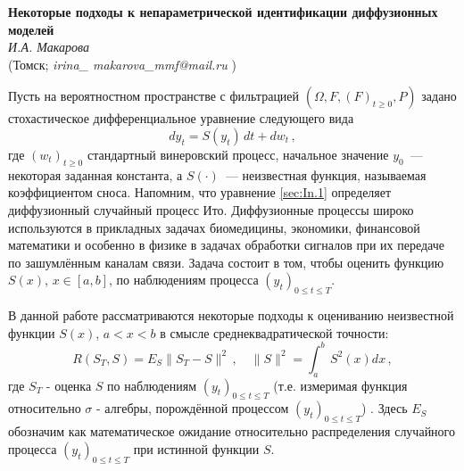 \begin{center}{ \bf  Некоторые подходы к непараметрической идентификации диффузионных моделей}\\
{\it И.А. Макарова } \\
(Томск; {\it irina\_ makarova\_mmf@mail.ru} )
\end{center}


Пусть на вероятностном пространстве с фильтрацией $(\Omega, F, (F)_{t\geqslant 0}, P)$ задано стохастическое дифференциальное уравнение следующего вида
 \begin{equation}\label{sec:In.1}
d y_{t}=S(y_{t})\,d t +d w_{t}\,,
 \end{equation}
где $(w_{t})_{t\geqslant 0}$ стандартный винеровский процесс,
начальное значение $y_{0}$~--- некоторая заданная константа,
а $S(\cdot)$~--- неизвестная функция, называемая коэффициентом сноса.
Напомним, что уравнение \eqref{sec:In.1} определяет диффузионный случайный процесс Ито.
Диффузионные процессы широко используются в прикладных задачах биомедицины, экономики, финансовой математики и особенно в физике в задачах обработки сигналов при их передаче по зашумлённым каналам связи.
Задача состоит в том, чтобы оценить функцию $S(x)$, $x\in[a,b]$, по наблюдениям процесса
$(y_{t})_{0\leqslant t\leqslant T}$.

В данной работе рассматриваются некоторые подходы к оцениванию неизвестной функции $S(x)$, $a<x<b$ в смысле среднеквадратической точности:
\begin{equation}\label{sec:In.2}
R({S}_{T},S)=E_{S}\|{S}_{T}-S\|^2\,,
\quad
\|S\|^2=\int^b_{a}\,S^2(x)d x\,,
\end{equation}
где ${S}_{T}$ - оценка
$S$ по наблюдениям $(y_{t})_{0\leqslant t\leqslant T}$ (т.е. измеримая функция относительно $\sigma$ - алгебры, порождённой процессом $(y_{t})_{0\leqslant t\leqslant T}$) . Здесь $E_{S}$ обозначим как математическое ожидание относительно распределения случайного процесса
 $(y_{t})_{0\leqslant t\leqslant T}$ при истинной функции $S$.

